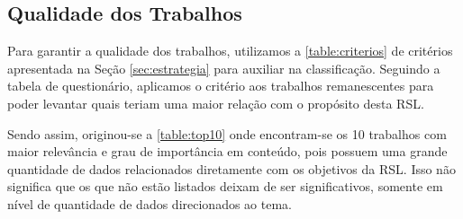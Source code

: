\subsection{Qualidade dos Trabalhos}
Para garantir a qualidade dos trabalhos, utilizamos a \ref{table:criterios} de critérios apresentada na Seção \ref{sec:estrategia} para auxiliar na classificação. Seguindo a tabela de questionário, aplicamos o critério aos trabalhos remanescentes para poder levantar quais teriam uma maior relação com o propósito desta RSL.

Sendo assim, originou-se a \ref{table:top10} onde encontram-se os 10 trabalhos com maior relevância e grau de importância em conteúdo, pois possuem uma grande quantidade de dados relacionados diretamente com os objetivos da RSL. Isso não significa que os que não estão listados deixam de ser significativos, somente em nível de quantidade de dados direcionados ao tema.


